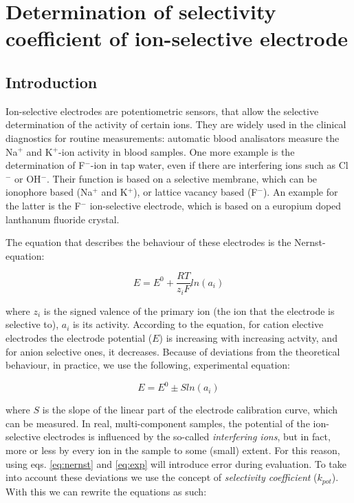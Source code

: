 \fancyhead[LO,RE]{\thesection}
\fancyfoot[LE,RO]{\thepage}

\section{Determination of selectivity coefficient of ion-selective electrode}
\subsection{Introduction}

Ion-selective electrodes are potentiometric sensors, that allow the selective determination of the activity of certain ions.
They are widely used in the clinical diagnostics for routine measurements: automatic blood analisators measure the Na$^+$ and K$^+$-ion activity in blood samples. One more example is the determination of F$^-$-ion in tap water, even if there are interfering ions such as Cl$^-$ or OH$^-$. Their function is based on a selective membrane, which can be ionophore based (Na$^+$ and K$^+$), or lattice vacancy based (F$^-$). An example for the latter is the F$^-$ ion-selective electrode, which is based on a europium doped lanthanum fluoride crystal.

The equation that describes the behaviour of these electrodes is the Nernst-equation:

\begin{equation}
\label{eq:nernst}
	E
	=
	E^0
	+\frac{RT}{z_i F}
	ln(a_i)
\end{equation}

where $z_i$ is the signed valence of the primary ion (the ion that the electrode is selective to), $a_i$ is its activity.
According to the equation, for cation elective electrodes the electrode potential ($E$) is increasing with increasing actvity, and for anion selective ones, it decreases.
Because of deviations from the theoretical behaviour, in practice, we use the following, experimental equation:

\begin{equation}
\label{eq:exp}
	E
	=
	E^0
	\pm S ln(a_i)
\end{equation}

where $S$ is the slope of the linear part of the electrode calibration curve, which can be measured.
In real, multi-component samples, the potential of the ion-selective electrodes is influenced by the so-called \emph{interfering ions}, but in fact, more or less by every ion in the sample to some (small) extent.
For this reason, using eqs. \ref{eq:nernst} and \ref{eq:exp} will introduce error during evaluation.
To take into account these deviations we use the concept of \emph{selectivity coefficient} ($k_{pot}$). With this we can rewrite the equations as such: 

